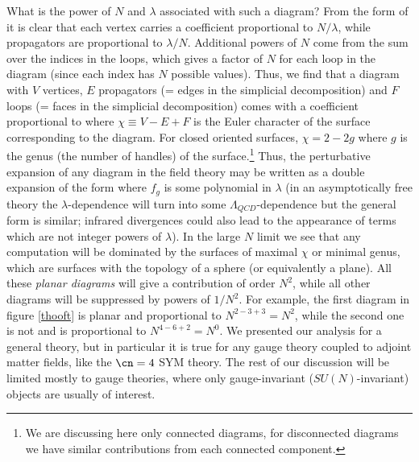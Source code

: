 What is the power of $N$ and $\lambda$ associated with such a
diagram? From the form of  it is clear that each
vertex carries a coefficient proportional to $N/ \lambda$, while
propagators are proportional to $\lambda / N$. Additional powers of
$N$ come from the sum over the indices in the loops, which gives a
factor of $N$ for each loop in the diagram (since each index has $N$
possible values). Thus, we find that a diagram with $V$ vertices, $E$
propagators (= edges in the simplicial decomposition) 
and $F$ loops (= faces in
the simplicial decomposition) comes with a coefficient proportional to
where $\chi \equiv V-E+F$ is the Euler character of the surface
corresponding to the diagram. For closed oriented surfaces, $\chi =
2-2g$ where $g$ is the genus (the number of handles) of the
surface.\footnote{We are discussing here only connected diagrams, for
disconnected diagrams we have similar contributions from each
connected component.}  Thus, the perturbative expansion of any diagram 
in the field theory may be
written as a double expansion of the form 
where $f_g$ is some polynomial in $\lambda$
(in an asymptotically free theory the $\lambda$-dependence will turn into
some $\Lambda_{QCD}$-dependence but the general form is similar; infrared
divergences could also lead to the appearance of terms which are not 
integer powers of
$\lambda$). 
In the large $N$ limit we see that any computation will be
dominated by the surfaces of maximal $\chi$ or minimal genus, which
are surfaces with the topology of a sphere (or equivalently a plane). 
All these {\it planar
diagrams} will give a contribution of order $N^2$, while all other
diagrams will be suppressed by powers of $1/N^2$. For example, the
first diagram in figure \ref{thooft} is planar and proportional to
$N^{2-3+3}=N^2$, while the second one is not and is proportional to 
$N^{4-6+2}=N^0$. We presented our
analysis for a general theory, but in particular it is true for any gauge
theory coupled to adjoint matter fields, like the $\cn=4$ SYM
theory. The rest of our discussion will be limited mostly to gauge
theories, where only gauge-invariant ($SU(N)$-invariant) objects are
usually of interest.

